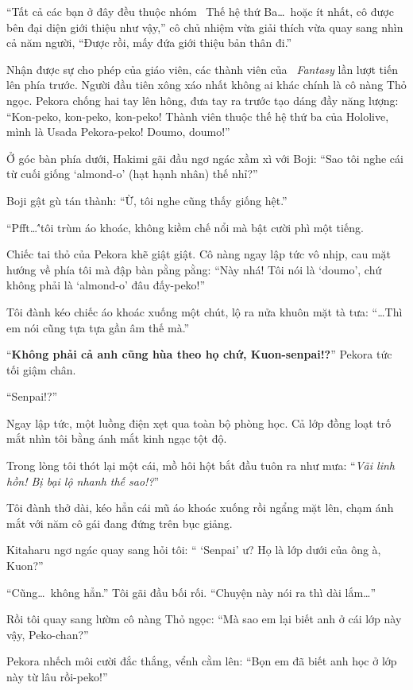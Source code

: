 \documentclass[../main.tex]{subfiles}
\begin{document}
``Tất cả các bạn ở đây đều thuộc nhóm \hll\ Thế hệ thứ Ba\dots\ hoặc ít nhất, cô được bên đại diện giới thiệu như vậy,'' cô chủ nhiệm vừa giải thích vừa quay sang nhìn cả năm người, ``Được rồi, mấy đứa giới thiệu bản thân đi.''

Nhận được sự cho phép của giáo viên, các thành viên của \textit{\hll\ Fantasy} lần lượt tiến lên phía trước. Người đầu tiên xông xáo nhất không ai khác chính là cô nàng Thỏ ngọc. Pekora chống hai tay lên hông, đưa tay ra trước tạo dáng đầy năng lượng: ``Kon-peko, kon-peko, kon-peko! Thành viên thuộc thế hệ thứ ba của Hololive, mình là Usada Pekora-peko! Doumo, doumo!''

Ở góc bàn phía dưới, Hakimi gãi đầu ngơ ngác xầm xì với Boji: ``Sao tôi nghe cái từ cuối giống `almond-o' (hạt hạnh nhân) thế nhỉ?''

Boji gật gù tán thành: ``Ừ, tôi nghe cũng thấy giống hệt.''

``Pfft\dots\''tôi trùm áo khoác, không kiềm chế nổi mà bật cười phì một tiếng.

Chiếc tai thỏ của Pekora khẽ giật giật. Cô nàng ngay lập tức vô nhịp, cau mặt hướng về phía tôi mà đập bàn pằng pằng: ``Này nhá! Tôi nói là `doumo', chứ không phải là `almond-o' đâu đấy-peko!''

Tôi đành kéo chiếc áo khoác xuống một chút, lộ ra nửa khuôn mặt tà tưa: ``\dots Thì em nói cũng tựa tựa gần âm thế mà.''

``\textbf{Không phải cả anh cũng hùa theo họ chứ, Kuon-senpai!?}'' Pekora tức tối giậm chân.

``Senpai!?''

Ngay lập tức, một luồng điện xẹt qua toàn bộ phòng học. Cả lớp đồng loạt trố mắt nhìn tôi bằng ánh mắt kinh ngạc tột độ.

Trong lòng tôi thót lại một cái, mồ hôi hột bắt đầu tuôn ra như mưa: ``\textit{Vãi linh hồn! Bị bại lộ nhanh thế sao!?}''

Tôi đành thở dài, kéo hẳn cái mũ áo khoác xuống rồi ngẩng mặt lên, chạm ánh mắt với năm cô gái đang đứng trên bục giảng.

Kitaharu ngơ ngác quay sang hỏi tôi: `` `Senpai' ư? Họ là lớp dưới của ông à, Kuon?''

``Cũng\dots\ không hẳn.'' Tôi gãi đầu bối rối. ``Chuyện này nói ra thì dài lắm\dots''

Rồi tôi quay sang lườm cô nàng Thỏ ngọc: ``Mà sao em lại biết anh ở cái lớp này vậy, Peko-chan?''

Pekora nhếch môi cười đắc thắng, vểnh cằm lên: ``Bọn em đã biết anh học ở lớp này từ lâu rồi-peko!''
\end{document}
